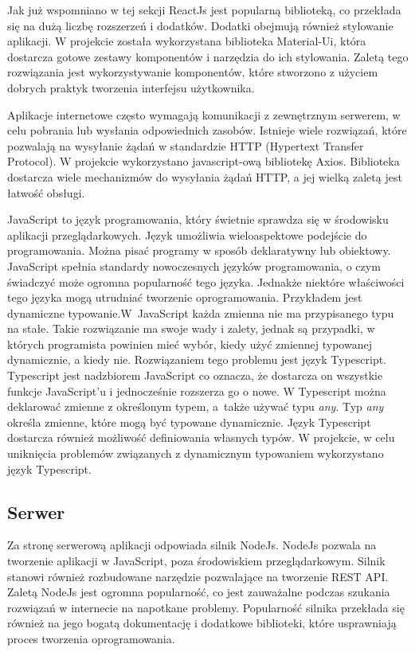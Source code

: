 \documentclass[a4paper,12pt]{book}
\begin{document}
Jak już wspomniano w tej sekcji ReactJs jest popularną biblioteką, co przekłada się na dużą liczbę rozszerzeń i dodatków. Dodatki obejmują również stylowanie aplikacji. W projekcie została wykorzystana biblioteka Material-Ui, która dostarcza gotowe zestawy komponentów i narzędzia do ich stylowania. Zaletą tego rozwiązania jest wykorzystywanie komponentów, które stworzono z użyciem dobrych praktyk tworzenia interfejsu użytkownika.

Aplikacje internetowe często wymagają komunikacji z zewnętrznym serwerem, w celu pobrania lub wysłania odpowiednich zasobów. Istnieje wiele rozwiązań, które pozwalają na wysyłanie żądań w standardzie HTTP (Hypertext Transfer Protocol). W projekcie wykorzystano javascript-ową bibliotekę Axios. Biblioteka dostarcza wiele mechanizmów do wysyłania żądań HTTP, a jej wielką zaletą jest łatwość obsługi.

JavaScript to język programowania, który świetnie sprawdza się w środowisku aplikacji przeglądarkowych. Język umożliwia wieloaspektowe podejście do programowania. Można pisać programy w sposób deklaratywny lub obiektowy. JavaScript spełnia standardy nowoczesnych języków programowania, o czym świadczyć może ogromna popularność tego języka. Jednakże niektóre właściwości tego języka mogą utrudniać tworzenie oprogramowania. Przykładem jest dynamiczne typowanie.W~JavaScript każda zmienna nie ma przypisanego typu na stałe. Takie rozwiązanie ma swoje wady i zalety, jednak są przypadki, w których programista powinien mieć wybór, kiedy użyć zmiennej typowanej dynamicznie, a kiedy nie. Rozwiązaniem tego problemu jest język Typescript. Typescript jest nadzbiorem JavaScript co oznacza, że dostarcza on wszystkie funkcje JavaScript'u i jednocześnie rozszerza go o nowe. W Typescript można deklarować zmienne z określonym typem, a~także używać typu \textit{any}. Typ \textit{any} określa zmienne, które mogą być typowane dynamicznie. Język Typescript dostarcza również możliwość definiowania własnych typów. W projekcie, w celu uniknięcia problemów związanych z dynamicznym typowaniem wykorzystano język Typescript.

\subsection{Serwer}
Za stronę serwerową aplikacji odpowiada silnik NodeJs. NodeJs pozwala na tworzenie aplikacji w JavaScript, poza środowiskiem przeglądarkowym. Silnik stanowi również rozbudowane narzędzie pozwalające na tworzenie REST API. Zaletą NodeJs jest ogromna popularność, co jest zauważalne podczas szukania rozwiązań w internecie na napotkane problemy. Popularność silnika przekłada się również na jego bogatą dokumentację i dodatkowe biblioteki, które usprawniają proces tworzenia oprogramowania.
\end{document}
